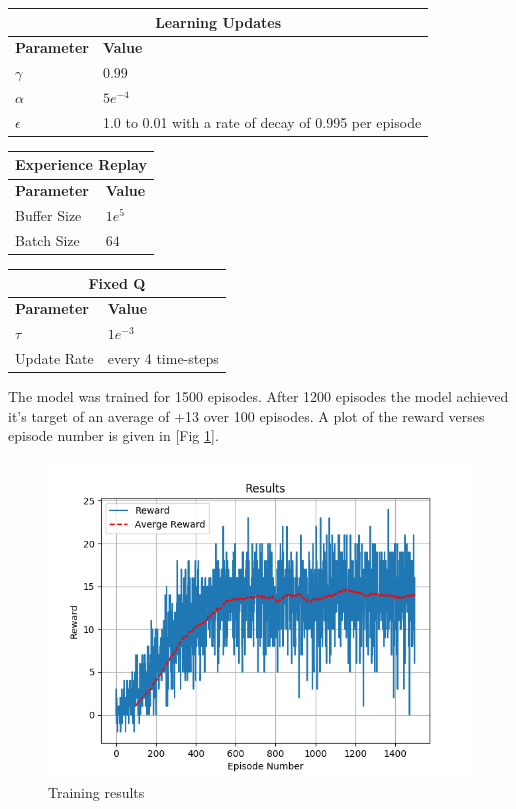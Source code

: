 \documentclass[12pt]{article}
\begin{document}
\begin{table}[h!]
\begin{center}
\begin{tabular}{|l|l|}
	\hline
	\multicolumn{2}{|c|}{\textbf{Learning Updates}}\\
	\hline
	\textbf{Parameter} & \textbf{Value}\\
	\hline
	$\gamma$ & $0.99$\\
	$\alpha$ & $5e^{-4}$\\
	$\epsilon$ & 1.0 to 0.01 with a rate of decay of 0.995 per episode\\
	\hline
\end{tabular}
\end{center}
\end{table}

\begin{table}[h!]
\begin{minipage}{.5\linewidth}
\begin{tabular}{|l|l|}
	\hline
	\multicolumn{2}{|c|}{\textbf{Experience Replay}}\\
	\hline
	\textbf{Parameter} & \textbf{Value}\\
	\hline
	Buffer Size & $1e^{5}$\\
	Batch Size & $64$\\
	\hline
\end{tabular}
\end{minipage}
\begin{minipage}{.5\linewidth}
\begin{tabular}{|l|l|}
	\hline
	\multicolumn{2}{|c|}{\textbf{Fixed Q}}\\
	\hline
	\textbf{Parameter} & \textbf{Value}\\
	\hline
		$\tau$ & $1e^{-3}$\\
		Update Rate & every 4 time-steps \\
	\hline
\end{tabular}
\end{minipage}
\end{table}

The model was trained for 1500 episodes. 
After 1200 episodes the model achieved it's target of an average of +13 over 100 episodes.
A plot of the reward verses episode number is given in [Fig \ref{results}].

\begin{figure}
	\centering
	\includegraphics[width=0.8\linewidth]{./img/Results.png}
	\caption{Training results}
	\label{results}
\end{figure}
\end{document}
